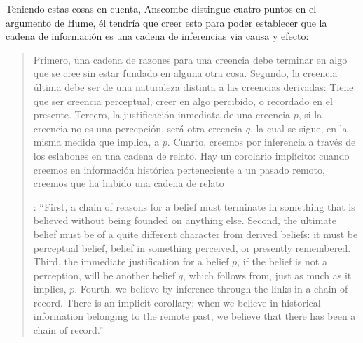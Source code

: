 Teniendo estas cosas en cuenta, Anscombe distingue cuatro puntos en el argumento de Hume, él tendría que creer esto para poder establecer que la cadena de información es una cadena de inferencias via causa y efecto: \blockquote[{\cite[88]{anscombe1981parmenides:humeandjulius}}: \enquote{First, a chain of reasons for a belief must terminate in something that is believed without being founded on anything else. Second, the ultimate belief must be of a quite different character from derived beliefs: it must be perceptual belief, belief in something perceived, or presently remembered. Third, the immediate justification for a belief $p$, if the belief is not a perception, will be another belief $q$, which follows from, just as much as it implies, $p$. Fourth, we believe by inference through the links in a chain of record.   There is an implicit corollary: when we believe in historical information belonging to the remote past, we believe that there has been a chain of record.}]{Primero, una cadena de razones para una creencia debe terminar en algo que se cree sin estar fundado en alguna otra cosa. Segundo, la creencia última debe ser de una naturaleza distinta a las creencias derivadas: Tiene que ser creencia perceptual, creer en algo percibido, o recordado en el presente. Tercero, la justificación inmediata de una creencia $p$, si la creencia no es una percepción, será otra creencia $q$, la cual se sigue, en la misma medida que implica, a $p$. Cuarto, creemos por inferencia a través de los eslabones en una cadena de relato. Hay un corolario implícito: cuando creemos en información histórica perteneciente a un pasado remoto, creemos que ha habido una cadena de relato}.

